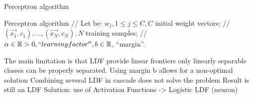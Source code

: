 \begin{algorithm}
   \caption{Perceptron algorithm}\label{euclid}
   \begin{algorithmic}[1]
      \State Perceptron algorithm
      \State // Let be: $w_j , 1 \leq j \leq C, C$ initial weight vectors;
      \State // $(\vec{x_1}, c_1), \dots , (\vec{x_N} , c_N ), N  $ training samples;
      \State // $\alpha \in \mathbb{R}>0, ``learning factor'', b \in \mathbb{R}$, ``margin''.
\end{algorithmic}
\end{algorithm}

The main limitation is that LDF provide linear frontiers only linearly separable classes
can be properly separated.
Using margin b allows for a non-optimal solution
Combining several LDF in cascade does not solve the problem
Result is still an LDF
Solution: use of Activation Functions -> Logistic LDF (neuron)

